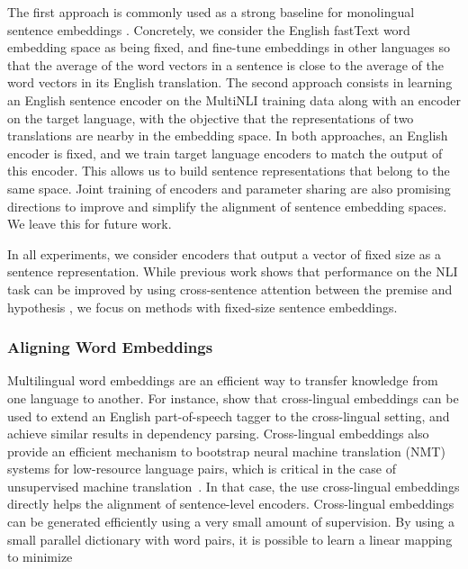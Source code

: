 \documentclass[11pt,a4paper]{article}
\begin{document}
The first approach is commonly used as a strong baseline for monolingual sentence embeddings \cite{arora2016asimple, conneau2018senteval, Gouws:2015:icml_bilbowa}. Concretely, we consider the English fastText word embedding space as being fixed, and fine-tune embeddings in other languages so that the average of the word vectors in a sentence is close to the average of the word vectors in its English translation. The second approach consists in learning an English sentence encoder on the MultiNLI training data along with an encoder on the target language, with the objective that the representations of two translations are nearby in the embedding space. In both approaches, an English encoder is fixed, and we train target language encoders to match the output of this encoder. This allows us to build sentence representations that belong to the same space. Joint training of encoders and parameter sharing are also promising directions to improve and simplify the alignment of sentence embedding spaces. We leave this for future work.


In all experiments, we consider encoders that output a vector of fixed size as a sentence representation. While previous work shows that performance on the NLI task can be improved by using cross-sentence attention between the premise and hypothesis \citep{rocktaschel2015reasoning,gong2017natural}, we focus on methods with fixed-size sentence embeddings.

\insertwordtranslationtable


\subsubsection{Aligning Word Embeddings}
\label{mul-word-emb}

Multilingual word embeddings are an efficient way to transfer knowledge from one language to another. For instance, \citet{zhang2016ten} show that cross-lingual embeddings can be used to extend an English part-of-speech tagger to the cross-lingual setting, and \citet{xiao2014distributed} achieve similar results in dependency parsing.
Cross-lingual embeddings also provide an efficient mechanism to bootstrap neural machine translation (NMT) systems for low-resource language pairs, which is critical in the case of un\-supervised machine translation~\cite{unsupNMTlample,unsupNMTartetxe,lample2018phrase}. In that case, the use cross-lingual embeddings directly helps the alignment of sentence-level encoders.
Cross-lingual embeddings can be generated efficiently using a very small amount of super\-vision. By using a small parallel dictionary with  word pairs, it is possible to learn a linear mapping to minimize
\end{document}
